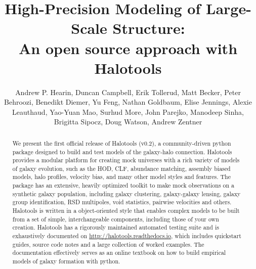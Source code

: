 \documentclass[twocolumn, tighten]{aastex6}
\begin{document}
\title{High-Precision Modeling of Large-Scale Structure: \\An open source approach with Halotools}

\author{Andrew P. Hearin, Duncan Campbell, Erik Tollerud,
Matt Becker, Peter Behroozi, Benedikt Diemer, Yu Feng, 
Nathan Goldbaum, Elise Jennings, Alexie Leauthaud, Yao-Yuan Mao, 
Surhud More, John Parejko, Manodeep Sinha, Brigitta Sipocz, 
Doug Watson, Andrew Zentner 
}


\begin{abstract}

We  present the first official release of Halotools (v0.2), a community-driven python package designed to build and test models of the galaxy-halo connection. Halotools provides a modular platform for creating mock universes with a rich variety of models of galaxy evolution, such as the HOD, CLF, abundance matching, assembly biased models, halo profiles, velocity bias, and many other model styles and features. The package has an extensive, heavily optimized toolkit to make mock observations on a synthetic galaxy population, including galaxy clustering, galaxy-galaxy lensing, galaxy group identification, RSD multipoles, void statistics, pairwise velocities and others. Halotools is written in a object-oriented style that enables complex models to be built from a set of simple, interchangeable components, including those of your own creation. Halotools has a rigorously maintained automated testing suite and is exhaustively documented on \url{http://halotools.readthedocs.io}, which includes quickstart guides, source code notes and a large collection of worked examples. The documentation effectively serves as an online textbook on how to build empirical models of galaxy formation with python. 
\end{abstract} 
\end{document}
